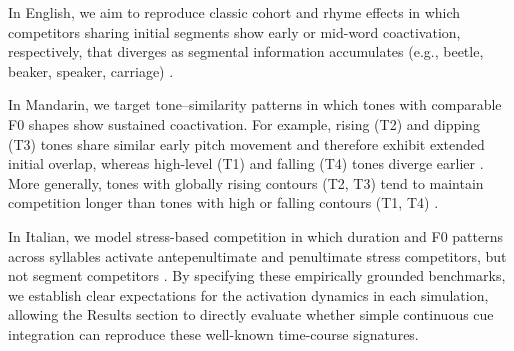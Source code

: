 In English, we aim to reproduce classic cohort and rhyme effects in which competitors sharing initial segments show early or mid-word coactivation, respectively, that diverges as segmental information accumulates (e.g., beetle, beaker, speaker, carriage) \cite{Allopenna1998}. 

In Mandarin, we target tone–similarity patterns in which tones with comparable F0 shapes show sustained coactivation. For example, rising (T2) and dipping (T3) tones share similar early pitch movement and therefore exhibit extended initial overlap, whereas high-level (T1) and falling (T4) tones diverge earlier \cite{Gandour2000}. More generally, tones with globally rising contours (T2, T3) tend to maintain competition longer than tones with high or falling contours (T1, T4) \cite{MalinsJoanisse2010,ShenFroud2019}. 

In Italian, we model stress-based competition in which duration and F0 patterns across syllables activate antepenultimate and penultimate stress competitors, but not segment competitors \cite{SulpizioMcQueen2012,BramlettWiener2025}. By specifying these empirically grounded benchmarks, we establish clear expectations for the activation dynamics in each simulation, allowing the Results section to directly evaluate whether simple continuous cue integration can reproduce these well-known time-course signatures.


